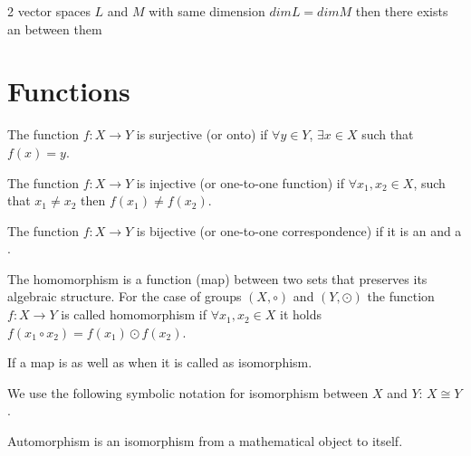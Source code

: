 \begin{lemma}
  2 vector spaces $L$ and $M$ with same dimension $dim L = dim M$ then
  there exists an  between them
  \label{lem:vsisomorphism}
\end{lemma}

\section{Functions}

\begin{definition}[Surjection]
  The function $f: X \rightarrow Y$ is surjective (or onto) if
  $\forall y \in Y$, $\exists x \in X$ such that
  $f\left(x\right) = y$.
  \label{def:surjection}
\end{definition}

\begin{definition}[Injection]
  The function $f: X \rightarrow Y$ is injective (or one-to-one function) if
  $\forall x_1, x_2 \in X$, such that $x_1 \ne x_2$ then
  $f\left(x_1\right) \ne f\left(x_2\right)$.
  \label{def:injection}
\end{definition}

\begin{definition}[Bijection]
  The function $f: X \rightarrow Y$ is bijective (or one-to-one
  correspondence) if it is an  and a
  . 
  \label{def:bijection}
\end{definition}

\begin{definition}[Homomorphism]
  The homomorphism is a function (map) between two sets that preserves
  its algebraic structure. For the case of groups
  $\left(X, \circ\right)$ and $\left(Y, \odot\right)$ the function
  $f: X \rightarrow Y$ is called homomorphism if
  $\forall x_1, x_2 \in X$ it holds
  $f\left(x_1 \circ x_2\right) = f\left(x_1 \right) \odot f\left( x_2\right)$.
  \label{def:homomorphism}
\end{definition}

\begin{definition}[Isomorphism]
  If a map is  as well as
   when it is called as isomorphism.

  We use the following symbolic notation for isomorphism between $X$
  and $Y$: $X \cong Y$.
  \label{def:isomorphism}
\end{definition}

\begin{definition}[Automorphism]
  Automorphism is an isomorphism from a mathematical object to itself.
  \label{def:automorphism}
\end{definition}

